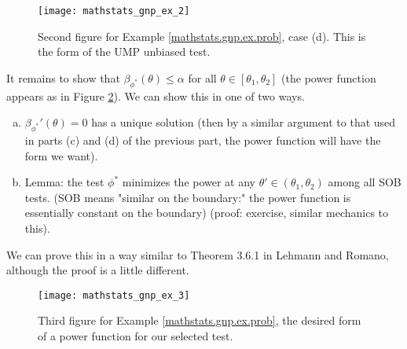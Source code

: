 \begin{solution}
\begin{enumerate}[(a)]
\begin{figure}[htbp]
\begin{center}
\texttt{[image: mathstats\_gnp\_ex\_2]}
\caption{Second figure for Example \ref{mathstats.gnp.ex.prob}, case (d). This is the form of the UMP unbiased test.}
\label{mathstats_gnp_ex_fig_2}
\end{center}
\end{figure}


\end{enumerate}

It remains to show that \(\beta_{\phi^*}(\theta) \leq \alpha\) for all \(\theta \in [\theta_1, \theta_2]\) (the power function appears as in Figure \ref{mathstats_gnp_ex_fig_3}). We can show this in one of two ways.

\begin{enumerate}[(a)]

\item \(\beta_{\phi^*}'(\theta) = 0\) has a unique solution (then by a similar argument to that used in parts (c) and (d) of the previous part, the power function will have the form we want).

\item Lemma: the test \(\phi^*\) minimizes the power at any \(\theta' \in (\theta_1, \theta_2)\) among all SOB tests. (SOB means "similar on the boundary:" the power function is essentially constant on the boundary) (proof: exercise, similar mechanics to this).

\end{enumerate}

We can prove this in a way similar to Theorem 3.6.1 in Lehmann and Romano, although the proof is a little different.

\begin{figure}[htbp]
\begin{center}
\texttt{[image: mathstats\_gnp\_ex\_3]}
\caption{Third figure for Example \ref{mathstats.gnp.ex.prob}, the desired form of a power function for our selected test.}
\label{mathstats_gnp_ex_fig_3}
\end{center}
\end{figure}

\end{solution}

